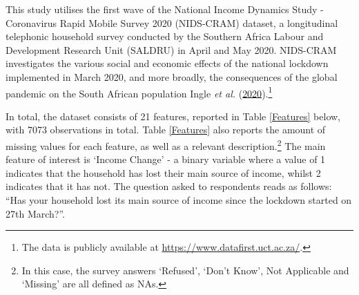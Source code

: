\documentclass[11pt,preprint, authoryear]{elsarticle}
\numberwithin{equation}{section}
\numberwithin{figure}{section}
\numberwithin{table}{section}
\let\rmarkdownfootnote\footnote%
\def\footnote{\protect\rmarkdownfootnote}
\begin{document}
This study utilises the first wave of the National Income Dynamics Study
- Coronavirus Rapid Mobile Survey 2020 (NIDS-CRAM) dataset, a
longitudinal telephonic household survey conducted by the Southern
Africa Labour and Development Research Unit (SALDRU) in April and May
2020. NIDS-CRAM investigates the various social and economic effects of
the national lockdown implemented in March 2020, and more broadly, the
consequences of the global pandemic on the South African population
Ingle \emph{et al.} (\protect\hyperlink{ref-nids2020}{2020}).\footnote{The
  data is publicly available at \url{https://www.datafirst.uct.ac.za/}.}

In total, the dataset consists of 21 features, reported in Table
\ref{Features} below, with 7073 observations in total. Table
\ref{Features} also reports the amount of missing values for each
feature, as well as a relevant description.\footnote{In this case, the
  survey answers `Refused', `Don't Know', Not Applicable and `Missing'
  are all defined as NAs.} The main feature of interest is `Income
Change' - a binary variable where a value of 1 indicates that the
household has lost their main source of income, whilst 2 indicates that
it has not. The question asked to respondents reads as follows: ``Has
your household lost its main source of income since the lockdown started
on 27th March?''.
\end{document}
